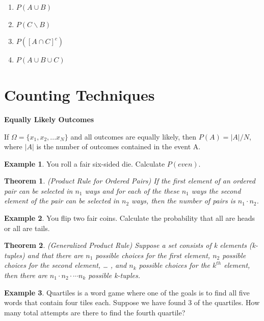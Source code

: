 \documentclass[
  11pt,
  oneside]{book}
\newtheorem{theorem}{Theorem}[chapter]
\theoremstyle{definition}
\theoremstyle{definition}
\newtheorem{example}{Example}[chapter]
\theoremstyle{definition}
\theoremstyle{definition}
\theoremstyle{remark}
\begin{document}
\begin{enumerate}
\def\labelenumi{(\alph{enumi})}
\item
  \(P(A \cup B)\)
  \vfill
\item
  \(P(C \backslash B)\)
  \vfill
\item
  \(P([A \cap C]^c)\)
  \vfill
\item
  \(P(A \cup B \cup C)\)
  \vfill
\end{enumerate}

\newpage

\section{Counting Techniques}\label{counting-techniques}

\textbf{Equally Likely Outcomes}

If \(\Omega = \lbrace x_1, x_2, ... x_N \rbrace\) and all outcomes are equally likely, then \(P(A) = |A| / N\), where \(|A|\) is the number of outcomes contained in the event A.

\begin{example}
You roll a fair six-sided die. Calculate \(P(even)\).
\end{example}

\vfill

\begin{theorem}
(Product Rule for Ordered Pairs) If the first element of an ordered pair can be selected in \(n_1\) ways and for each of the these \(n_1\) ways the second element of the pair can be selected in \(n_2\) ways, then the number of pairs is \(n_1 \cdot n_2\).
\end{theorem}

\begin{example}
You flip two fair coins. Calculate the probability that all are heads or all are tails.
\end{example}

\vfill

\begin{theorem}
(Generalized Product Rule) Suppose a set consists of k elements (k-tuples) and that there are \(n_1\) possible choices for the first element, \(n_2\) possible choices for the second element, \ldots{} , and \(n_k\) possible choices for the \(k^{th}\) element, then there are \(n_1 \cdot n_2 \cdot \cdots n_k\) possible k-tuples.
\end{theorem}

\begin{example}
\leavevmode

Quartiles is a word game where one of the goals is to find all five words that contain four tiles each. Suppose we have found 3 of the quartiles. How many total attempts are there to find the fourth quartile?

\end{example}
\end{document}
